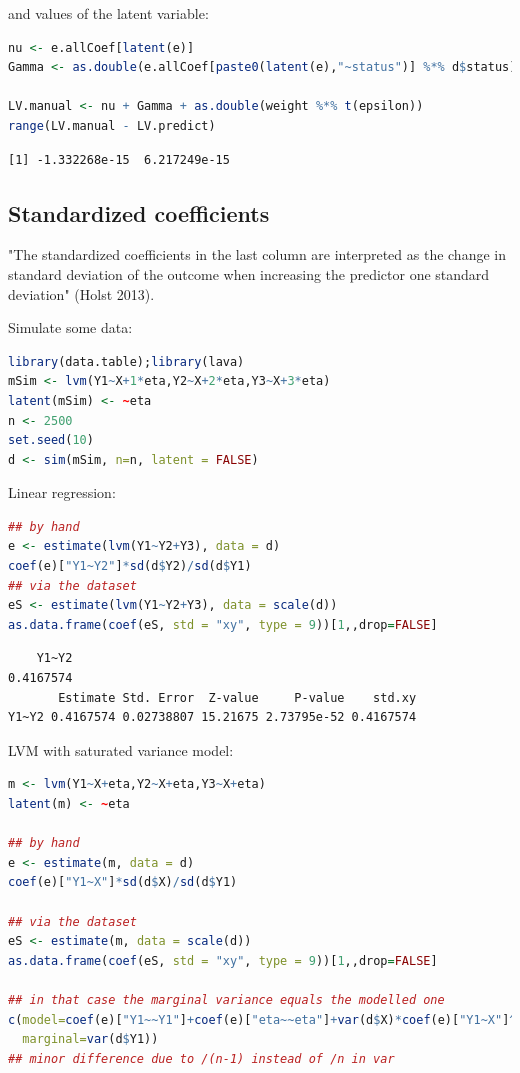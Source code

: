 \documentclass{article}
\begin{document}
and values of the latent variable:
\begin{lstlisting}[language=r,numbers=none]
nu <- e.allCoef[latent(e)]
Gamma <- as.double(e.allCoef[paste0(latent(e),"~status")] %*% d$status)

LV.manual <- nu + Gamma + as.double(weight %*% t(epsilon))
range(LV.manual - LV.predict)
\end{lstlisting}

\label{}
\begin{verbatim}
[1] -1.332268e-15  6.217249e-15
\end{verbatim}
\subsection{Standardized coefficients}
\label{sec:orgfbf1b92}

"The standardized coefficients in the last column are interpreted as
the change in standard deviation of the outcome when increasing the
predictor one standard deviation" (Holst 2013).

\bigskip

Simulate some data:
\begin{lstlisting}[language=r,numbers=none]
library(data.table);library(lava)
mSim <- lvm(Y1~X+1*eta,Y2~X+2*eta,Y3~X+3*eta)
latent(mSim) <- ~eta
n <- 2500
set.seed(10)
d <- sim(mSim, n=n, latent = FALSE)
\end{lstlisting}

Linear regression:
\begin{lstlisting}[language=r,numbers=none]
## by hand
e <- estimate(lvm(Y1~Y2+Y3), data = d)
coef(e)["Y1~Y2"]*sd(d$Y2)/sd(d$Y1)
## via the dataset
eS <- estimate(lvm(Y1~Y2+Y3), data = scale(d))
as.data.frame(coef(eS, std = "xy", type = 9))[1,,drop=FALSE]
\end{lstlisting}

\label{}
\begin{verbatim}
    Y1~Y2 
0.4167574
       Estimate Std. Error  Z-value     P-value    std.xy
Y1~Y2 0.4167574 0.02738807 15.21675 2.73795e-52 0.4167574
\end{verbatim}


LVM with saturated variance model:
\begin{lstlisting}[language=r,numbers=none]
m <- lvm(Y1~X+eta,Y2~X+eta,Y3~X+eta)
latent(m) <- ~eta

## by hand
e <- estimate(m, data = d)
coef(e)["Y1~X"]*sd(d$X)/sd(d$Y1)

## via the dataset
eS <- estimate(m, data = scale(d))
as.data.frame(coef(eS, std = "xy", type = 9))[1,,drop=FALSE]

## in that case the marginal variance equals the modelled one
c(model=coef(e)["Y1~~Y1"]+coef(e)["eta~~eta"]+var(d$X)*coef(e)["Y1~X"]^2,
  marginal=var(d$Y1))
## minor difference due to /(n-1) instead of /n in var
\end{lstlisting}
\end{document}
